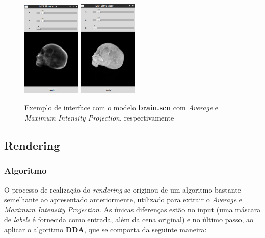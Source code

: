             \begin{figure}[ht!]
                \centering
                \includegraphics[width=1.1in]{figures/mip_avg}
                \includegraphics[width=1.1in]{figures/mip_max}
                \caption{Exemplo de interface com o modelo \textbf{brain.scn} com \textit{Average} e \textit{Maximum Intensity Projection}, respectivamente}
            \end{figure}

    \subsection{Rendering}
        \subsubsection{Algoritmo}
            O processo de realização do \textit{rendering} se originou de um algoritmo bastante semelhante ao apresentado anteriormente, utilizado para extrair o \textit{Average} e \textit{Maximum Intensity Projection}. As únicas diferenças estão no input (uma máscara de \textit{labels} é fornecida como entrada, além da cena original) e no último passo, ao aplicar o algoritmo \textbf{DDA}, que se comporta da seguinte maneira:

